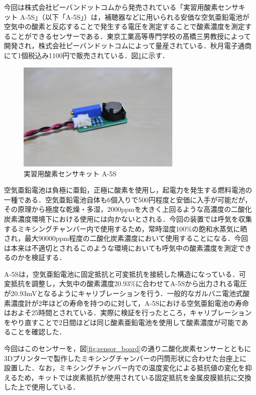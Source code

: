 今回は株式会社ピーバンドットコムから発売されている「実習用酸素センサキット A-5S」（以下「A-5S」）は，補聴器などに用いられる安価な空気亜鉛電池が空気中の酸素と反応することで発生する電圧を測定することで酸素濃度を測定することができるセンサーである．東京工業高等専門学校の髙橋三男教授によって開発され，株式会社ピーバンドットコムによって量産されている．秋月電子通商にて1個税込み1100円で販売されている．図\ref{fig:a-5s}に示す．

\begin{figure}[H]
  \begin{center}
    \includegraphics[width=8cm]{fig/a-5s}
    \caption{実習用酸素センサキット A-5S}
    \label{fig:a-5s}
  \end{center}
\end{figure}

空気亜鉛電池は負極に亜鉛，正極に酸素を使用し，起電力を発生する燃料電池の一種である．空気亜鉛電池自体も6個入りで500円程度と安価に入手が可能だが，その原理から極度な乾燥・多湿，2000ppmを大きく上回るような高濃度の二酸化炭素濃度環境下における使用には向かないとされる．今回の装置では呼気を収集するミキシングチャンバー内で使用するため，常時湿度100\%の飽和水蒸気に晒され，最大90000ppm程度の二酸化炭素濃度において使用することになる．今回は本来は不適切とされるこのような環境においても呼気中の酸素濃度を測定できるのかを検証する．

A-5Sは，空気亜鉛電池に固定抵抗と可変抵抗を接続した構造になっている．可変抵抗を調整し，大気中の酸素濃度20.93\%に合わせてA-5Sから出力される電圧が20.93mVとなるようにキャリブレーションを行う．一般的なガルバニ電池式酸素濃度計が2年ほどの寿命を持つのに対して，A-5Sにおける空気亜鉛電池の寿命はおよそ25時間とされている．実際に検証を行ったところ，キャリブレーションをやり直すことで2日間ほどは同じ酸素亜鉛電池を使用して酸素濃度が可能であることを確認した．

今回はこのセンサーを，図\ref{fig:sensor_board}の通り二酸化炭素センサーとともに3Dプリンターで製作したミキシングチャンバーの円筒形状に合わせた台座上に設置した．なお，ミキシングチャンバー内での温度変化による抵抗値の変化を抑えるため，キットでは炭素抵抗が使用されている固定抵抗を金属皮膜抵抗に交換した上で使用している．

